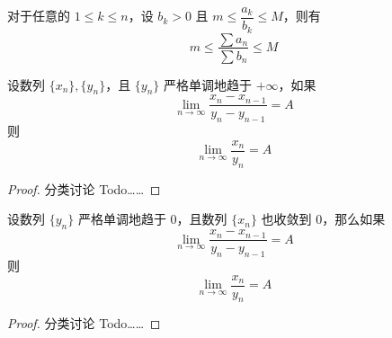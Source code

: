 \begin{theorem}
	对于任意的 $1 \leqslant k \leqslant n$，设 $b_k>0$ 且 $m \leqslant \dfrac{a_k}{b_k} \leqslant M$，则有
	$$m \leqslant \frac{\sum a_n}{\sum b_n} \leqslant M$$
\end{theorem}

\begin{theorem}
	设数列 $\{x_n\},\{y_n\}$，且 $\{y_n\}$ 严格单调地趋于 $+\infty$，如果
	$$\lim_{n\to \infty}\frac{x_n-x_{n-1}}{y_n-y_{n-1}}=A$$
	则
	$$\lim_{n\to \infty} \frac{x_n}{y_n} = A$$
\end{theorem}

\begin{proof}
	分类讨论 Todo……
\end{proof}

\begin{theorem}
	设数列 $\{y_n\}$ 严格单调地趋于 $0$，且数列 $\{x_n\}$ 也收敛到 $0$，那么如果
	$$\lim_{n\to \infty}\frac{x_n-x_{n-1}}{y_n-y_{n-1}}=A$$
	则
	$$\lim_{n\to \infty} \frac{x_n}{y_n} = A$$
\end{theorem}

\begin{proof}
	分类讨论 Todo……
\end{proof}
